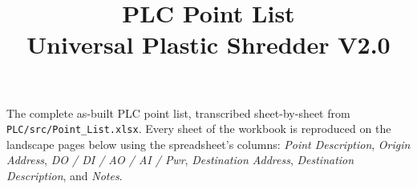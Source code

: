 \documentclass[letterpaper,11pt]{article}
\title{\color{PSUgreen}\textbf{PLC Point List}\\\large Universal Plastic Shredder V2.0}
\author{}
\date{}
\begin{document}
\maketitle
\thispagestyle{fancy}

\noindent The complete as-built PLC point list, transcribed sheet-by-sheet from
\texttt{PLC/src/Point\_List.xlsx}. Every sheet of the workbook is reproduced on
the landscape pages below using the spreadsheet's columns: \emph{Point
Description}, \emph{Origin Address}, \emph{DO / DI / AO / AI / Pwr},
\emph{Destination Address}, \emph{Destination Description}, and \emph{Notes}.

\vspace{1em}


\end{document}
